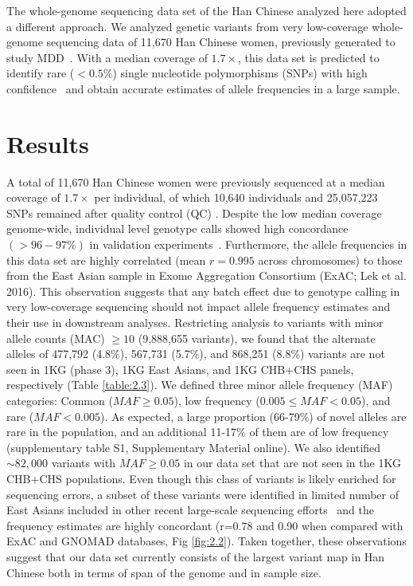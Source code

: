 The whole-genome sequencing data set of the Han Chinese analyzed here adopted a different approach. We analyzed genetic variants from very low-coverage whole-genome sequencing data of 11,670 Han Chinese women, previously generated to study MDD~\cite{cai2015sparse}. With a median coverage of $1.7\times$, this data set is predicted to identify rare ($<0.5\%$) single nucleotide polymorphisms (SNPs) with high confidence~\cite{sidore2015genome} and obtain accurate estimates of allele frequencies in a large sample. 

\section{Results}
A total of 11,670 Han Chinese women were previously sequenced at a median coverage of $1.7\times$ per individual, of which 10,640 individuals and 25,057,223 SNPs remained after quality control (QC) \cite{cai2015sparse,cai201711}. Despite the low median coverage genome-wide, individual level genotype calls showed high concordance $(>96 - 97\%)$ in validation experiments~\cite{cai201711}. Furthermore, the allele frequencies in this data set are highly correlated (mean $r=0.995$ across chromosomes) to those from the East Asian sample in Exome Aggregation Consortium (ExAC; Lek et al. 2016). This observation suggests that any batch effect due to genotype calling in very low-coverage sequencing should not impact allele frequency estimates and their use in downstream analyses.
Restricting analysis to variants with minor allele counts (MAC) $\ge10$ (9,888,655 variants), we found that the alternate alleles of 477,792 (4.8\%), 567,731 (5.7\%), and 868,251 (8.8\%) variants are not seen in 1KG (phase 3), 1KG East Asians, and 1KG CHB+CHS panels, respectively (Table \ref{table:2.3}). We defined three minor allele frequency (MAF) categories: Common ($MAF \ge 0.05$), low frequency ($0.005\le MAF < 0.05$), and rare ($MAF < 0.005$). As expected, a large proportion (66-79\%) of novel alleles are rare in the population, and an additional 11-17\% of them are of low frequency (supplementary table S1, Supplementary Material online). We also identified $\sim82,000$ variants with $MAF \ge 0.05$ in our data set that are not seen in the 1KG CHB+CHS populations. Even though this class of variants is likely enriched for sequencing errors, a subset of these variants were identified in limited number of East Asians included in other recent large-scale sequencing efforts~\cite{lek2016analysis} and the frequency estimates are highly concordant (r=0.78 and 0.90 when compared with ExAC and GNOMAD databases, Fig \ref{fig:2.2}). Taken together, these observations suggest that our data set currently consists of the largest variant map in Han Chinese both in terms of span of the genome and in sample size.

